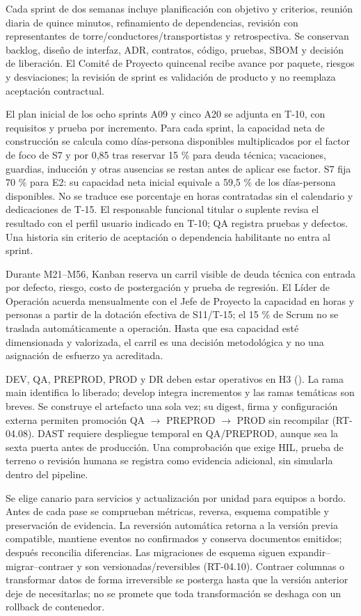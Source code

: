 Cada sprint de dos semanas incluye planificación con objetivo y criterios, reunión diaria de quince minutos, refinamiento de dependencias, revisión con representantes de torre/conductores/transportistas y retrospectiva. Se conservan backlog, diseño de interfaz, ADR, contratos, código, pruebas, SBOM y decisión de liberación. El Comité de Proyecto quincenal recibe avance por paquete, riesgos y desviaciones; la revisión de sprint es validación de producto y no reemplaza aceptación contractual.

El plan inicial de los ocho sprints A09 y cinco A20 se adjunta en T-10, con requisitos y prueba por incremento. Para cada sprint, la capacidad neta de construcción se calcula como días-persona disponibles multiplicados por el factor de foco de S7 y por 0,85 tras reservar 15 \% para deuda técnica; vacaciones, guardias, inducción y otras ausencias se restan antes de aplicar ese factor. S7 fija 70 \% para E2: su capacidad neta inicial equivale a 59,5 \% de los días-persona disponibles. No se traduce ese porcentaje en horas contratadas sin el calendario y dedicaciones de T-15. El responsable funcional titular o suplente revisa el resultado con el perfil usuario indicado en T-10; QA registra pruebas y defectos. Una historia sin criterio de aceptación o dependencia habilitante no entra al sprint.

Durante M21–M56, Kanban reserva un carril visible de deuda técnica con entrada por defecto, riesgo, costo de postergación y prueba de regresión. El Líder de Operación acuerda mensualmente con el Jefe de Proyecto la capacidad en horas y personas a partir de la dotación efectiva de S11/T-15; el 15 \% de Scrum no se traslada automáticamente a operación. Hasta que esa capacidad esté dimensionada y valorizada, el carril es una decisión metodológica y no una asignación de esfuerzo ya acreditada.

DEV, QA, PREPROD, PROD y DR deben estar operativos en H3 (). La rama main identifica lo liberado; develop integra incrementos y las ramas temáticas son breves. Se construye el artefacto una sola vez; su digest, firma y configuración externa permiten promoción QA $\rightarrow$ PREPROD $\rightarrow$ PROD sin recompilar (RT-04.08). DAST requiere despliegue temporal en QA/PREPROD, aunque sea la sexta puerta antes de producción. Una comprobación que exige HIL, prueba de terreno o revisión humana se registra como evidencia adicional, sin simularla dentro del pipeline.

Se elige canario para servicios y actualización por unidad para equipos a bordo. Antes de cada pase se comprueban métricas, reversa, esquema compatible y preservación de evidencia. La reversión automática retorna a la versión previa compatible, mantiene eventos no confirmados y conserva documentos emitidos; después reconcilia diferencias. Las migraciones de esquema siguen expandir–migrar–contraer y son versionadas/reversibles (RT-04.10). Contraer columnas o transformar datos de forma irreversible se posterga hasta que la versión anterior deje de necesitarlas; no se promete que toda transformación se deshaga con un rollback de contenedor.

